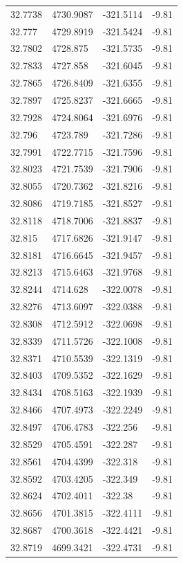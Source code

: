 \begin{table}[H]
\begin{tabular}{llll}
32.7738 & 4730.9087 & -321.5114 & -9.81 \\
32.777 & 4729.8919 & -321.5424 & -9.81 \\
32.7802 & 4728.875 & -321.5735 & -9.81 \\
32.7833 & 4727.858 & -321.6045 & -9.81 \\
32.7865 & 4726.8409 & -321.6355 & -9.81 \\
32.7897 & 4725.8237 & -321.6665 & -9.81 \\
32.7928 & 4724.8064 & -321.6976 & -9.81 \\
32.796 & 4723.789 & -321.7286 & -9.81 \\
32.7991 & 4722.7715 & -321.7596 & -9.81 \\
32.8023 & 4721.7539 & -321.7906 & -9.81 \\
32.8055 & 4720.7362 & -321.8216 & -9.81 \\
32.8086 & 4719.7185 & -321.8527 & -9.81 \\
32.8118 & 4718.7006 & -321.8837 & -9.81 \\
32.815 & 4717.6826 & -321.9147 & -9.81 \\
32.8181 & 4716.6645 & -321.9457 & -9.81 \\
32.8213 & 4715.6463 & -321.9768 & -9.81 \\
32.8244 & 4714.628 & -322.0078 & -9.81 \\
32.8276 & 4713.6097 & -322.0388 & -9.81 \\
32.8308 & 4712.5912 & -322.0698 & -9.81 \\
32.8339 & 4711.5726 & -322.1008 & -9.81 \\
32.8371 & 4710.5539 & -322.1319 & -9.81 \\
32.8403 & 4709.5352 & -322.1629 & -9.81 \\
32.8434 & 4708.5163 & -322.1939 & -9.81 \\
32.8466 & 4707.4973 & -322.2249 & -9.81 \\
32.8497 & 4706.4783 & -322.256 & -9.81 \\
32.8529 & 4705.4591 & -322.287 & -9.81 \\
32.8561 & 4704.4399 & -322.318 & -9.81 \\
32.8592 & 4703.4205 & -322.349 & -9.81 \\
32.8624 & 4702.4011 & -322.38 & -9.81 \\
32.8656 & 4701.3815 & -322.4111 & -9.81 \\
32.8687 & 4700.3618 & -322.4421 & -9.81 \\
32.8719 & 4699.3421 & -322.4731 & -9.81 \\

\end{tabular}
\end{table}
